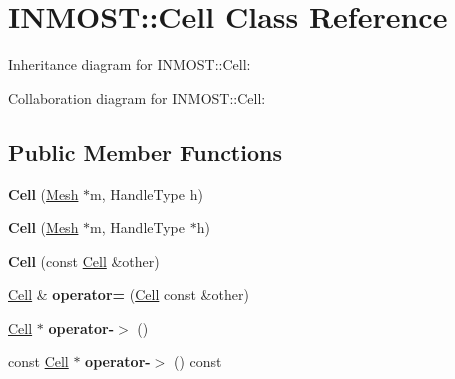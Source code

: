 \hypertarget{classINMOST_1_1Cell}{\section{I\-N\-M\-O\-S\-T\-:\-:Cell Class Reference}
\label{classINMOST_1_1Cell}
}


Inheritance diagram for I\-N\-M\-O\-S\-T\-:\-:Cell\-:


Collaboration diagram for I\-N\-M\-O\-S\-T\-:\-:Cell\-:
\subsection*{Public Member Functions}
\begin{DoxyCompactItemize}
\item 
\hypertarget{classINMOST_1_1Cell_a6a5d747177264baf51981526d687160e}{{\bfseries Cell} (\hyperlink{classINMOST_1_1Mesh}{Mesh} $\ast$m, Handle\-Type h)}\label{classINMOST_1_1Cell_a6a5d747177264baf51981526d687160e}

\item 
\hypertarget{classINMOST_1_1Cell_a3775295eb0087a53085e760ef15f7a5e}{{\bfseries Cell} (\hyperlink{classINMOST_1_1Mesh}{Mesh} $\ast$m, Handle\-Type $\ast$h)}\label{classINMOST_1_1Cell_a3775295eb0087a53085e760ef15f7a5e}

\item 
\hypertarget{classINMOST_1_1Cell_a2caed8dde9efdcd45bbab752beb1bc48}{{\bfseries Cell} (const \hyperlink{classINMOST_1_1Cell}{Cell} \&other)}\label{classINMOST_1_1Cell_a2caed8dde9efdcd45bbab752beb1bc48}

\item 
\hypertarget{classINMOST_1_1Cell_a42506f458c54cc177a56444d88b01770}{\hyperlink{classINMOST_1_1Cell}{Cell} \& {\bfseries operator=} (\hyperlink{classINMOST_1_1Cell}{Cell} const \&other)}\label{classINMOST_1_1Cell_a42506f458c54cc177a56444d88b01770}

\item 
\hypertarget{classINMOST_1_1Cell_a56ea16402b10b39c53c7c0fbc60ef748}{\hyperlink{classINMOST_1_1Cell}{Cell} $\ast$ {\bfseries operator-\/$>$} ()}\label{classINMOST_1_1Cell_a56ea16402b10b39c53c7c0fbc60ef748}

\item 
\hypertarget{classINMOST_1_1Cell_a2f1b082d4303e9a36dcd7f37abf16698}{const \hyperlink{classINMOST_1_1Cell}{Cell} $\ast$ {\bfseries operator-\/$>$} () const }\label{classINMOST_1_1Cell_a2f1b082d4303e9a36dcd7f37abf16698}


\end{DoxyCompactItemize}
